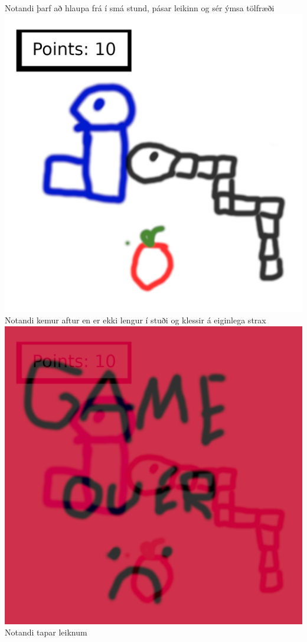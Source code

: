 \documentclass{article}
\begin{document}
\begin{center}
    Notandi þarf að hlaupa frá í smá stund, pásar leikinn og sér ýmsa tölfræði\\
    \includegraphics[scale=0.75]{m5.png}\\
    Notandi kemur aftur en er ekki lengur í stuði og klessir á eiginlega strax\\
    \includegraphics[scale=0.75]{m6.png}\\
    Notandi tapar leiknum\\
\end{center}
\end{document}
